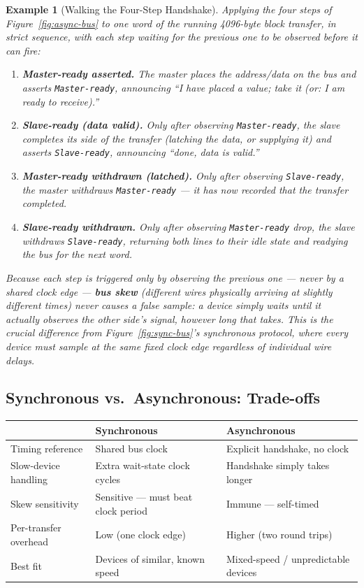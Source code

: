 \documentclass[11pt]{article}
\newtheorem{example}{Example}[section]
\begin{document}
\begin{example}[Walking the Four-Step Handshake]
\label{ex:async-trace}
Applying the four steps of Figure~\ref{fig:async-bus} to one word of the running 4096-byte block transfer, in strict sequence, with each step waiting for the previous one to be observed before it can fire:
\begin{enumerate}
  \item \textbf{Master-ready asserted.} The master places the address/data on the bus and asserts \texttt{Master-ready}, announcing ``I have placed a value; take it (or: I am ready to receive).''
  \item \textbf{Slave-ready (data valid).} Only after observing \texttt{Master-ready}, the slave completes its side of the transfer (latching the data, or supplying it) and asserts \texttt{Slave-ready}, announcing ``done, data is valid.''
  \item \textbf{Master-ready withdrawn (latched).} Only after observing \texttt{Slave-ready}, the master withdraws \texttt{Master-ready} --- it has now recorded that the transfer completed.
  \item \textbf{Slave-ready withdrawn.} Only after observing \texttt{Master-ready} drop, the slave withdraws \texttt{Slave-ready}, returning both lines to their idle state and readying the bus for the next word.
\end{enumerate}
Because each step is triggered only by observing the previous one --- never by a shared clock edge --- \textbf{bus skew} (different wires physically arriving at slightly different times) never causes a false sample: a device simply waits until it actually observes the other side's signal, however long that takes. This is the crucial difference from Figure~\ref{fig:sync-bus}'s synchronous protocol, where every device must sample at the same fixed clock edge regardless of individual wire delays.
\end{example}

\subsection{Synchronous vs.\ Asynchronous: Trade-offs}

\begin{center}
\footnotesize
\begin{tabular}{@{}lll@{}}
\toprule
& \textbf{Synchronous} & \textbf{Asynchronous} \\
\midrule
Timing reference & Shared bus clock & Explicit handshake, no clock \\
Slow-device handling & Extra wait-state clock cycles & Handshake simply takes longer \\
Skew sensitivity & Sensitive --- must beat clock period & Immune --- self-timed \\
Per-transfer overhead & Low (one clock edge) & Higher (two round trips) \\
Best fit & Devices of similar, known speed & Mixed-speed / unpredictable devices \\
\bottomrule
\end{tabular}
\end{center}
\end{document}
